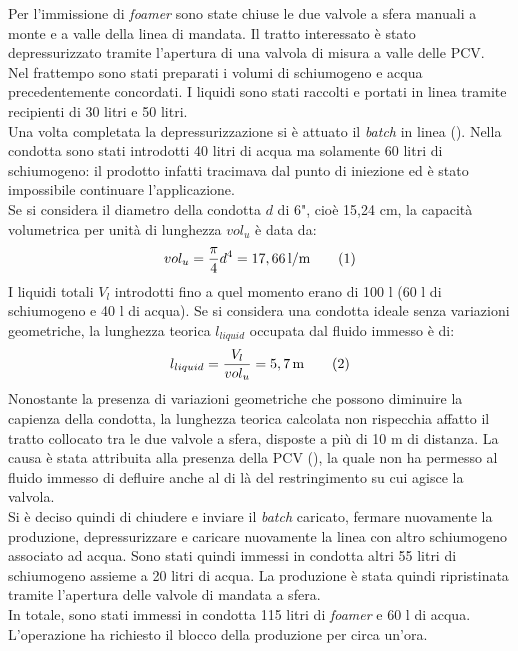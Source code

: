 Per l'immissione di \textit{foamer} sono state chiuse le due valvole a sfera manuali a monte e a valle della linea di mandata. Il tratto interessato è stato depressurizzato tramite l'apertura di una valvola di misura a valle delle PCV.\\
Nel frattempo sono stati preparati i volumi di schiumogeno e acqua precedentemente concordati. I liquidi sono stati raccolti e portati in linea tramite recipienti di 30 litri e 50 litri. \\
Una volta completata la depressurizzazione si è attuato il \textit{batch} in linea (). Nella condotta sono stati introdotti 40 litri di acqua ma solamente 60 litri di schiumogeno: il prodotto infatti tracimava dal punto di iniezione ed è stato impossibile continuare l'applicazione.\\
Se si considera il diametro della condotta \(d\) di 6", cioè 15,24 cm, la capacità volumetrica per unità di lunghezza \(vol_u\) è data da:
\[vol_{u}=\dfrac{\pi}{4}d^4=17,66 \, \mathrm{l/m} \addtag \]
I liquidi totali \(V_l\) introdotti fino a quel momento erano di 100 l (60 l di schiumogeno e 40 l di acqua). Se si considera una condotta ideale senza variazioni geometriche, la lunghezza teorica \(l_{liquid}\) occupata dal fluido immesso è di:
\[l_{liquid}=\dfrac{V_l}{vol_u}=5,7 \, \mathrm{m} \addtag \]
Nonostante la presenza di variazioni geometriche che possono diminuire la capienza della condotta, la lunghezza teorica calcolata non rispecchia affatto il tratto collocato tra le due valvole a sfera, disposte a più di 10 m di distanza. La causa è stata attribuita alla presenza della PCV (), la quale non ha permesso al fluido immesso di defluire anche al di là del restringimento su cui agisce la valvola.\\
Si è deciso quindi di chiudere e inviare il \textit{batch} caricato, fermare nuovamente la produzione, depressurizzare e caricare nuovamente la linea con altro schiumogeno associato ad acqua. Sono stati quindi immessi in condotta altri 55 litri di schiumogeno assieme a 20 litri di acqua. La produzione è stata quindi ripristinata tramite l'apertura delle valvole di mandata a sfera.\\
In totale, sono stati immessi in condotta 115 litri di \textit{foamer} e 60 l di acqua. L'operazione ha richiesto il blocco della produzione per circa un'ora.
